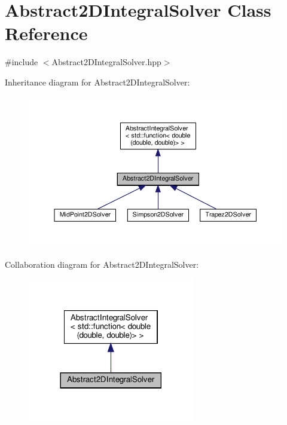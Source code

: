 \hypertarget{class_abstract2_d_integral_solver}{}\section{Abstract2\+D\+Integral\+Solver Class Reference}
\label{class_abstract2_d_integral_solver}


{\ttfamily \#include $<$Abstract2\+D\+Integral\+Solver.\+hpp$>$}



Inheritance diagram for Abstract2\+D\+Integral\+Solver\+:\nopagebreak
\begin{figure}[H]
\begin{center}
\leavevmode
\includegraphics[width=350pt]{class_abstract2_d_integral_solver__inherit__graph}
\end{center}
\end{figure}


Collaboration diagram for Abstract2\+D\+Integral\+Solver\+:\nopagebreak
\begin{figure}[H]
\begin{center}
\leavevmode
\includegraphics[width=206pt]{class_abstract2_d_integral_solver__coll__graph}
\end{center}
\end{figure}
